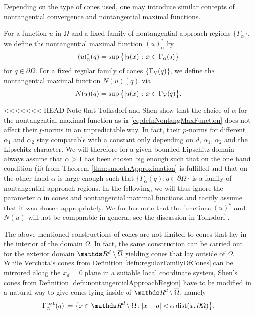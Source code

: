 Depending on the type of cones used, one may introduce similar concepts of nontangential convergence and nontangential maximal functions.

\begin{defn}
  For a function $u$ in $\Omega$ and a fixed family of nontangential approach regions $\{\Gamma_\alpha\}$, we define the nontangential maximal function $(u)_\alpha^*$ by
\begin{align}
  \label{eq:defnNontangMaxFunction}
  (u)_\alpha^*(q) = \sup\big\{ |u(x)| \colon x \in \Gamma_\alpha(q)\big\}
\end{align}
for $q \in \partial\Omega$.
  For a fixed regular family of cones $\{\Gamma_\mathrm{V}(q)\}$, we define the nontangential maximal function $N(u)(q)$ via
  \begin{align*}
    N(u)(q) = \sup\big\{ |u(x)| \colon x \in \Gamma_\mathrm{V}(q)\big\}.
  \end{align*}
\end{defn}

<<<<<<< HEAD
Note that Tolksdorf \cite[Prop.\@4.1.11]{tolksdorf} and Shen \cite[Prop.\@7.1.2]{Shen2017} show that the choice of $\alpha$ for the nontangential maximal function as in \ref{eq:defnNontangMaxFunction} does not affect their $p$-norms in an unpredictable way. In fact, their $p$-norms for different $\alpha_1$ and $\alpha_2$ stay comparable with a constant only depending on $d$, $\alpha_1$, $\alpha_2$ and the Lipschitz character.
We will therefore for a given bounded Lipschitz domain always assume that $\alpha > 1$ has been chosen big enough such that on the one hand condition (ii) from Theorem \ref{thm:smoothApproximation} is fulfilled and that on the other hand $\alpha$ is large enough such that $\big\{ \Gamma_\alpha(q) \colon q \in \partial\Omega \big\}$ is a family of nontangential approach regions.
In the following, we will thus ignore the parameter $\alpha$ in cones and nontangential maximal functions and tacitly assume that it was chosen appropriately.
We further note that the functions $(u)^*$ and $N(u)$ will not be comparable in general, see the discussion in Tolksdorf \cite[p.\@91]{tolksdorf}.

The above mentioned constructions of cones are not limited to cones that lay in the interior of the domain $\Omega$.
In fact, the same construction can be carried out for the exterior domain $\R^d \setminus \overline{\Omega}$ yielding cones that lay outside of $\Omega$. While Verchota's cones from Definition \ref{defn:regularFamilyOfCones} can be mirrored along the $x_d = 0$ plane in a suitable local coordinate system, Shen's cones from Definition \ref{defn:nontangentialApproachRegion} have to be modified in a natural way to give cones lying inside of $\R^d \setminus \overline \Omega$, namely
\begin{align*}
  \Gamma_\alpha^{\,\mathrm{ext}}(q) \coloneqq \big\{ x \in \R^d \setminus \overline \Omega \colon |x - q| < \alpha \operatorname{dist}(x, \partial\Omega)\big\}.
\end{align*}

